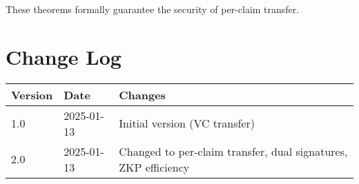 These theorems formally guarantee the security of per-claim transfer.

\section{Change Log}

\begin{table}[h]
\centering
\begin{tabular}{|l|l|l|}
\hline
\textbf{Version} & \textbf{Date} & \textbf{Changes} \\
\hline
1.0 & 2025-01-13 & Initial version (VC transfer) \\
\hline
2.0 & 2025-01-13 & Changed to per-claim transfer, dual signatures, ZKP efficiency \\
\hline
\end{tabular}
\end{table}
